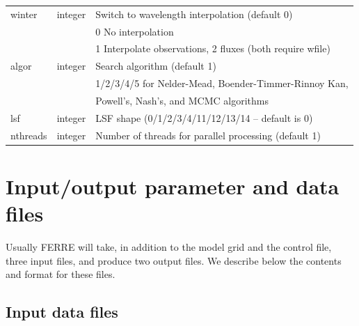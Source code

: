 \documentclass[12pt]{article}
\begin{document}
\begin{table}
\begin{tabular}{lcl}
winter  &   integer            & Switch to wavelength interpolation (default 0) \\
        &                      & 0 No interpolation \\
        &                      & 1 Interpolate observations, 2 fluxes (both require wfile) \\
 algor  &  integer             & Search algorithm (default 1) \\
         &                      & 1/2/3/4/5 for Nelder-Mead, Boender-Timmer-Rinnoy Kan, \\
         &                      & Powell's,  Nash's, and MCMC algorithms \\
 lsf     &  integer             & LSF shape (0/1/2/3/4/11/12/13/14 -- default is 0) \\
 nthreads &  integer            & Number of threads for parallel processing (default 1) \\
\hline
\end{tabular} 
\end{table}

\section{Input/output parameter and data files}
\label{inout}

Usually FERRE will take, in addition to the model grid and the control file, 
three input files, and produce two output files. We describe below the 
contents and format for these files. 

\subsection{Input data files}
\label{input}
\end{document}
